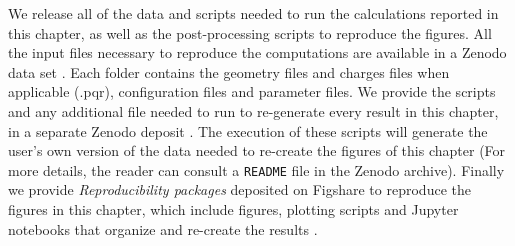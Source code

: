 We release all of the data and scripts needed to run the calculations reported in this chapter, 
as well as the post-processing scripts to reproduce the figures. 
All the input files necessary to reproduce the computations are available in a Zenodo data set \cite{ClementiETal2018a}. 
Each folder contains the geometry files and charges files when applicable (.pqr), configuration files and parameter files.
We provide the scripts and any additional file needed to run \pygbe to re-generate every result in this chapter, in a 
separate Zenodo deposit \cite{ClementiETal2018b}. The execution of these scripts will generate the user's own version of the data needed to re-create 
the figures of this chapter (For more details, the reader can consult a \texttt{README} file in the Zenodo archive).
Finally we provide \emph{Reproducibility packages} deposited on Figshare to reproduce the figures in this chapter, which include 
figures, plotting scripts and Jupyter notebooks that organize and re-create the results 
\cite{ClementiETal2018c,ClementiETal2018d,ClementiETal2018e,ClementiETal2018f}.
